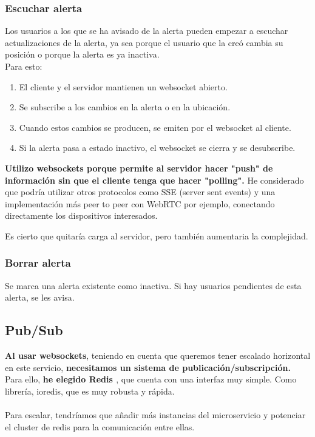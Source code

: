 \subsubsection{Escuchar alerta}\label{subsec:websocket}
Los usuarios a los que se ha avisado de la alerta pueden empezar a escuchar actualizaciones de la alerta,
ya sea porque el usuario que la creó cambia su posición o porque la alerta es ya inactiva. \\
Para esto:
\begin{enumerate}
	\item El cliente y el servidor mantienen un websocket abierto.
	\item Se subscribe a los cambios en la alerta o en la ubicación.
	\item Cuando estos cambios se producen, se emiten por el websocket al cliente.
	\item Si la alerta pasa a estado inactivo, el websocket se cierra y se desubscribe.
\end{enumerate}
\textbf{Utilizo websockets porque permite al servidor hacer "push" de información sin que el cliente tenga que hacer "polling".}
He considerado que podría utilizar otros protocolos como SSE (server sent events) y una implementación más peer to peer con WebRTC por ejemplo, conectando directamente los dispositivos interesados.

Es cierto que quitaría carga al servidor, pero también aumentaria la complejidad.

\subsubsection{Borrar alerta}
Se marca una alerta existente como inactiva. Si hay usuarios pendientes de esta alerta, se les avisa.


\subsection{Pub/Sub}\label{sec:pubsub}
\textbf{Al usar websockets}, teniendo en cuenta que queremos tener escalado horizontal en este servicio,
\textbf{necesitamos un sistema de publicación/subscripción.} \\
Para ello, \textbf{he elegido Redis \cite{redis}}, que cuenta con una interfaz muy simple. Como librería, ioredis, 
que es muy robusta y rápida.\\ \\

Para escalar, tendríamos que añadir más instancias del microservicio y potenciar el cluster de redis para la comunicación entre ellas.

